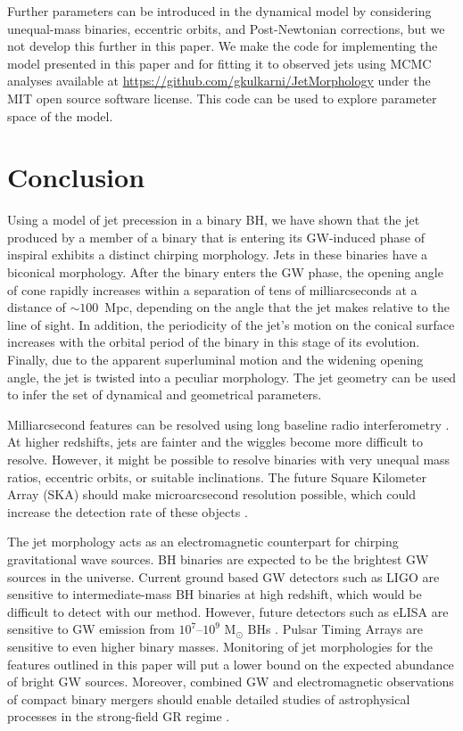 \documentclass[a4paper,fleqn,usenatbib]{mnras}
\begin{document}
Further parameters can be introduced in the dynamical model by
considering unequal-mass binaries, eccentric orbits, and
Post-Newtonian corrections, but we not develop this further in this
paper.  We make the code for implementing the model presented in this
paper and for fitting it to observed jets using MCMC analyses
available at \url{https://github.com/gkulkarni/JetMorphology} under
the MIT open source software license.  This code can be used to
explore parameter space of the model.

\section{Conclusion}

Using a model of jet precession in a binary BH, we have shown that the
jet produced by a member of a binary that is entering its GW-induced
phase of inspiral exhibits a distinct chirping morphology.  Jets in
these binaries have a biconical morphology.  After the binary enters
the GW phase, the opening angle of cone rapidly increases within a
separation of tens of milliarcseconds at a distance of $\sim 100$~Mpc,
depending on the angle that the jet makes relative to the line of
sight.  In addition, the periodicity of the jet's motion on the
conical surface increases with the orbital period of the binary in
this stage of its evolution.  Finally, due to the apparent
superluminal motion and the widening opening angle, the jet is twisted
into a peculiar morphology.  The jet geometry can be used to infer the
set of dynamical and geometrical parameters.

Milliarcsecond features can be resolved using long baseline radio
interferometry \citep{2001ChJAA...1..236Q}.  At higher redshifts, jets
are fainter and the wiggles become more difficult to resolve.
However, it might be possible to resolve binaries with very unequal
mass ratios, eccentric orbits, or suitable inclinations.  The future
Square Kilometer Array (SKA) should make microarcsecond resolution
possible, which could increase the detection rate of these objects
\citep{2015aska.confE.143P}.

The jet morphology acts as an electromagnetic counterpart for chirping
gravitational wave sources.  BH binaries are expected to be the
brightest GW sources in the universe.  Current ground based GW
detectors such as LIGO are sensitive to intermediate-mass BH binaries
at high redshift, which would be difficult to detect with our method.
However, future detectors such as eLISA are sensitive to GW emission
from $10^7$--$10^9$ M$_\odot$ BHs \citep{2013CQGra..30x4009S}.  Pulsar
Timing Arrays are sensitive to even higher binary masses.  Monitoring
of jet morphologies for the features outlined in this paper will put
a lower bound on the expected abundance of bright GW
sources. Moreover, combined GW and electromagnetic observations of
compact binary mergers should enable detailed studies of astrophysical
processes in the strong-field GR regime \citep{2005ApJ...629...15H}.
\end{document}
